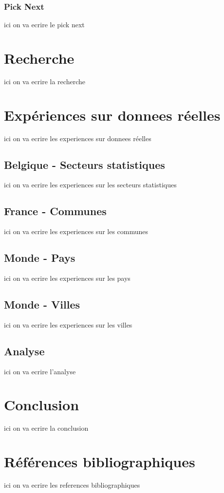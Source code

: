 \documentclass {article}
\begin{document}
\subsubsection {Pick Next}
ici on va ecrire le pick next

\section {Recherche}
ici on va ecrire la recherche

\section {Expériences sur donnees réelles}
ici on va ecrire les experiences sur donnees réelles

\subsection {Belgique - Secteurs statistiques}
ici on va ecrire les experiences sur les secteurs statistiques

\subsection {France - Communes}
ici on va ecrire les experiences sur les communes

\subsection {Monde - Pays}
ici on va ecrire les experiences sur les pays

\subsection {Monde - Villes}
ici on va ecrire les experiences sur les villes

\subsection {Analyse}
ici on va ecrire l'analyse

\section {Conclusion}
ici on va ecrire la conclusion

\section {Références bibliographiques}
ici on va ecrire les references bibliographiques
\end{document}
